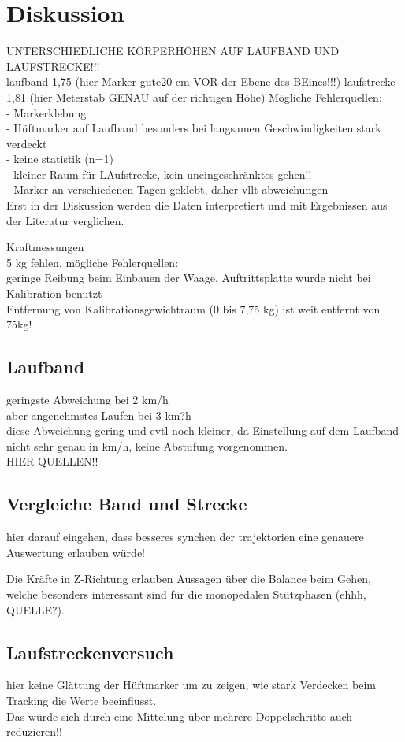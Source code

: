\section{Diskussion}

UNTERSCHIEDLICHE KÖRPERHÖHEN AUF LAUFBAND UND LAUFSTRECKE!!!\\
laufband 1,75 (hier Marker gute20 cm VOR der Ebene des BEines!!!)
laufstrecke 1,81 (hier Meterstab GENAU auf der richtigen Höhe)
Mögliche Fehlerquellen:\\
- Markerklebung\\
- Hüftmarker auf Laufband besonders bei langsamen Geschwindigkeiten stark verdeckt\\
- keine statistik (n=1)\\
- kleiner Raum für LAufstrecke, kein uneingeschränktes gehen!!\\
- Marker an verschiedenen Tagen geklebt, daher vllt abweichungen\\

Erst in der Diskussion werden die Daten interpretiert und mit Ergebnissen aus der Literatur verglichen.


Kraftmessungen\\
5 kg fehlen, mögliche Fehlerquellen:\\
geringe Reibung beim Einbauen der Waage, Auftrittsplatte wurde nicht bei Kalibration benutzt\\
Entfernung von Kalibrationsgewichtraum (0 bis 7,75 kg) ist weit entfernt von 75kg!\\

\subsection{Laufband}

geringste Abweichung bei 2 km/h\\
aber angenehmstes Laufen bei 3 km?h\\
diese Abweichung gering und evtl noch kleiner, da Einstellung auf dem Laufband nicht sehr genau in km/h, keine Abstufung vorgenommen.\\
HIER QUELLEN!!\\

\subsection{Vergleiche Band und Strecke}

hier darauf eingehen, dass besseres synchen der trajektorien eine genauere Auswertung erlauben würde!

Die Kräfte in Z-Richtung erlauben Aussagen über die Balance beim Gehen, welche besonders interessant sind für die monopedalen Stützphasen (ehhh, QUELLE?).\\

\subsection{Laufstreckenversuch}
hier keine Glättung der Hüftmarker um zu zeigen, wie stark Verdecken beim Tracking die Werte beeinflusst.\\
Das würde sich durch eine Mittelung über mehrere Doppelschritte auch reduzieren!!\\